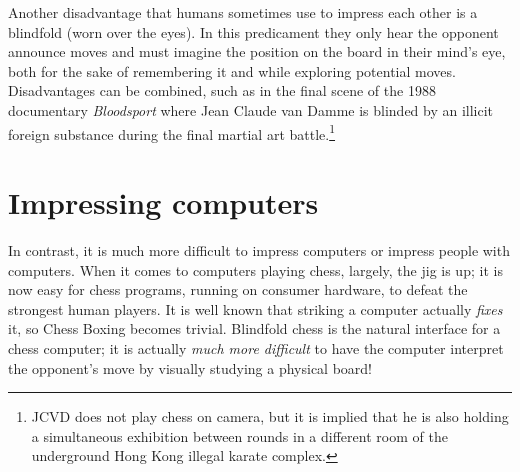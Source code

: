 \documentclass[twocolumn]{amsart}
\begin{document}
Another disadvantage that humans sometimes use to impress each other
is a blindfold (worn over the eyes). In this predicament they only
hear the opponent announce moves and must imagine the position on the
board in their mind's eye, both for the sake of remembering it and
while exploring potential moves.
Disadvantages can be combined, such as in the final scene of the 1988
documentary {\it Bloodsport} where Jean Claude van Damme is blinded by
an illicit foreign substance during the final martial art
battle.\footnote{JCVD does not play chess on camera, but it is implied
  that he is also holding a simultaneous exhibition between rounds in
  a different room of the underground Hong Kong illegal karate
  complex.}

\section{Impressing computers}

In contrast, it is much more difficult to impress computers or impress
people with computers. When it comes to computers playing chess,
largely, the jig is up; it is now easy for chess programs, running on
consumer hardware, to defeat the strongest human players. It is well
known that striking a computer actually {\em fixes} it, so Chess
Boxing becomes trivial. Blindfold chess is the natural interface for a
chess computer; it is actually {\em much more difficult} to have the
computer interpret the opponent's move by visually studying a physical
board!

\end{document}
